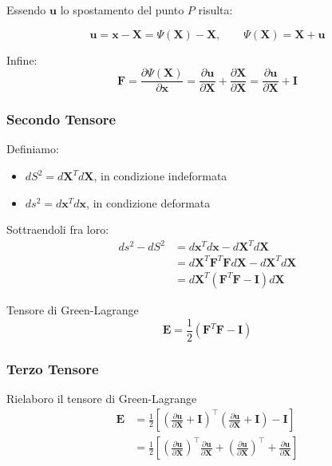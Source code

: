 Essendo $\mathbf{u}$ lo spostamento del punto $P$ risulta:

\begin{equation*}
\mathbf{u} = \mathbf{x} - \mathbf{X} = \Psi(\mathbf{X}) -\mathbf{X}, \quad \quad \Psi(\mathbf{X}) = \mathbf{X}+ \mathbf{u}
\end{equation*}

Infine: 
\begin{equation*}
\boldsymbol{F} = \frac{\partial\Psi(\mathbf{X})}{\partial \mathbf{x} } = \frac{ \partial \mathbf{u} }{\partial \mathbf{X} } + \frac{ \partial\mathbf{X} }{ \partial\mathbf{X} } = \frac{ \partial \mathbf{u} }{\partial \mathbf{X} } + \boldsymbol{I} 
\end{equation*}

\subsubsection*{Secondo Tensore}

Definiamo:
\begin{itemize}
    \item $dS^2 = d\mathbf{X}^T  d\mathbf{X} $, in condizione indeformata
    \item $ds^2 = d\mathbf{x}^T  d\mathbf{x} $, in condizione deformata
\end{itemize}
Sottraendoli fra loro:
\begin{align*}
    ds^2 - dS^2 &= d\mathbf{x}^T  d\mathbf{x}  - d\mathbf{X}^T  d\mathbf{X}\\
    &=  d\mathbf{X}^T \boldsymbol{F}^T \boldsymbol{F} d\mathbf{X} - d\mathbf{X}^T  d\mathbf{X}\\
    &= d\mathbf{X}^T (\boldsymbol{F}^T \boldsymbol{F} - \boldsymbol{I}) d\mathbf{X}
\end{align*}

\begin{definizioneBox}
    Tensore di Green-Lagrange
    \begin{equation*}
\boldsymbol{E} = \frac{1}{2} \left(\boldsymbol{F}^T \boldsymbol{F} - \boldsymbol{I}\right)
\end{equation*}
\end{definizioneBox}

\subsubsection*{Terzo Tensore}

Rielaboro il tensore di Green-Lagrange
\begin{align*}
\boldsymbol{E} &= \frac{1}{2} \left[ \left( \frac{\partial \mathbf{u}}{\partial \mathbf{X}} + \boldsymbol{I} \right)^{\!\top} \left( \frac{\partial \mathbf{u}}{\partial \mathbf{X}} + \boldsymbol{I} \right) - \boldsymbol{I} \right] \\
&= \frac{1}{2} \left[ \left( \frac{\partial \mathbf{u}}{\partial \mathbf{X}} \right)^{\!\top} \frac{\partial \mathbf{u}}{\partial \mathbf{X}} + \left( \frac{\partial \mathbf{u}}{\partial \mathbf{X}} \right)^{\!\top} + \frac{\partial \mathbf{u}}{\partial \mathbf{X}} \right]
\end{align*}

